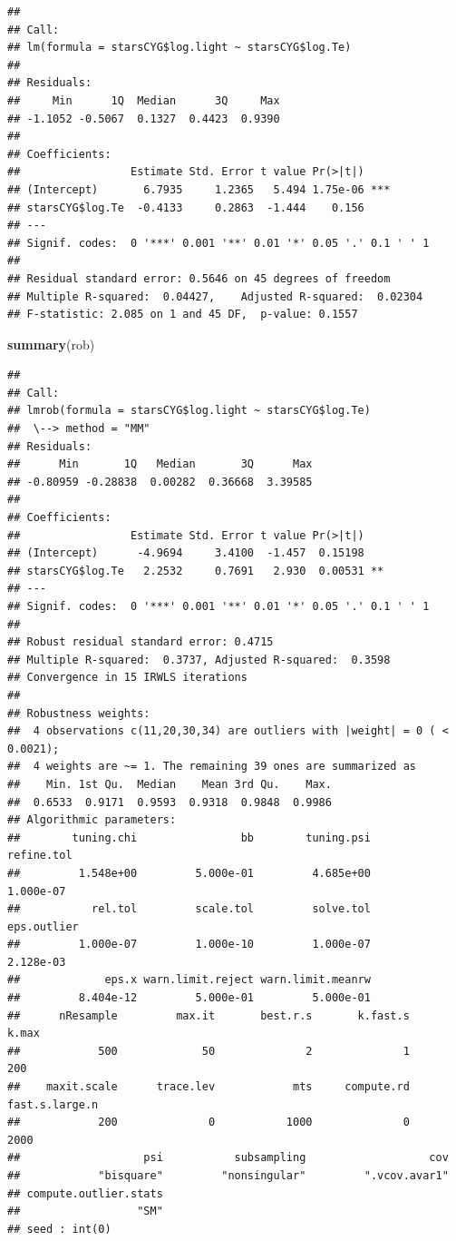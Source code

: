 \documentclass[]{book}
\newenvironment{Shaded}{\begin{snugshade}}{\end{snugshade}}
\newcommand{\KeywordTok}[1]{\textcolor[rgb]{0.13,0.29,0.53}{\textbf{#1}}}
\newcommand{\NormalTok}[1]{#1}
\theoremstyle{definition}
\theoremstyle{definition}
\theoremstyle{definition}
\theoremstyle{remark}
\begin{document}
\begin{verbatim}
## 
## Call:
## lm(formula = starsCYG$log.light ~ starsCYG$log.Te)
## 
## Residuals:
##     Min      1Q  Median      3Q     Max 
## -1.1052 -0.5067  0.1327  0.4423  0.9390 
## 
## Coefficients:
##                 Estimate Std. Error t value Pr(>|t|)    
## (Intercept)       6.7935     1.2365   5.494 1.75e-06 ***
## starsCYG$log.Te  -0.4133     0.2863  -1.444    0.156    
## ---
## Signif. codes:  0 '***' 0.001 '**' 0.01 '*' 0.05 '.' 0.1 ' ' 1
## 
## Residual standard error: 0.5646 on 45 degrees of freedom
## Multiple R-squared:  0.04427,    Adjusted R-squared:  0.02304 
## F-statistic: 2.085 on 1 and 45 DF,  p-value: 0.1557
\end{verbatim}

\begin{Shaded}
\begin{Highlighting}[]
\KeywordTok{summary}\NormalTok{(rob)}
\end{Highlighting}
\end{Shaded}

\begin{verbatim}
## 
## Call:
## lmrob(formula = starsCYG$log.light ~ starsCYG$log.Te)
##  \--> method = "MM"
## Residuals:
##      Min       1Q   Median       3Q      Max 
## -0.80959 -0.28838  0.00282  0.36668  3.39585 
## 
## Coefficients:
##                 Estimate Std. Error t value Pr(>|t|)   
## (Intercept)      -4.9694     3.4100  -1.457  0.15198   
## starsCYG$log.Te   2.2532     0.7691   2.930  0.00531 **
## ---
## Signif. codes:  0 '***' 0.001 '**' 0.01 '*' 0.05 '.' 0.1 ' ' 1
## 
## Robust residual standard error: 0.4715 
## Multiple R-squared:  0.3737, Adjusted R-squared:  0.3598 
## Convergence in 15 IRWLS iterations
## 
## Robustness weights: 
##  4 observations c(11,20,30,34) are outliers with |weight| = 0 ( < 0.0021); 
##  4 weights are ~= 1. The remaining 39 ones are summarized as
##    Min. 1st Qu.  Median    Mean 3rd Qu.    Max. 
##  0.6533  0.9171  0.9593  0.9318  0.9848  0.9986 
## Algorithmic parameters: 
##        tuning.chi                bb        tuning.psi        refine.tol 
##         1.548e+00         5.000e-01         4.685e+00         1.000e-07 
##           rel.tol         scale.tol         solve.tol       eps.outlier 
##         1.000e-07         1.000e-10         1.000e-07         2.128e-03 
##             eps.x warn.limit.reject warn.limit.meanrw 
##         8.404e-12         5.000e-01         5.000e-01 
##      nResample         max.it       best.r.s       k.fast.s          k.max 
##            500             50              2              1            200 
##    maxit.scale      trace.lev            mts     compute.rd fast.s.large.n 
##            200              0           1000              0           2000 
##                   psi           subsampling                   cov 
##            "bisquare"         "nonsingular"         ".vcov.avar1" 
## compute.outlier.stats 
##                  "SM" 
## seed : int(0)
\end{verbatim}
\end{document}
